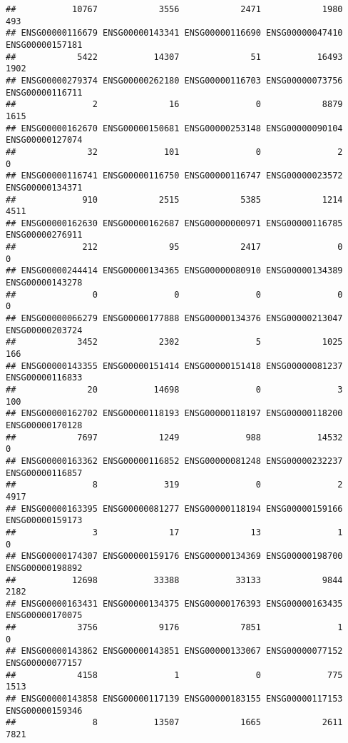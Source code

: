 \documentclass[
]{article}
\begin{document}
\begin{verbatim}
##           10767            3556            2471            1980             493 
## ENSG00000116679 ENSG00000143341 ENSG00000116690 ENSG00000047410 ENSG00000157181 
##            5422           14307              51           16493            1902 
## ENSG00000279374 ENSG00000262180 ENSG00000116703 ENSG00000073756 ENSG00000116711 
##               2              16               0            8879            1615 
## ENSG00000162670 ENSG00000150681 ENSG00000253148 ENSG00000090104 ENSG00000127074 
##              32             101               0               2               0 
## ENSG00000116741 ENSG00000116750 ENSG00000116747 ENSG00000023572 ENSG00000134371 
##             910            2515            5385            1214            4511 
## ENSG00000162630 ENSG00000162687 ENSG00000000971 ENSG00000116785 ENSG00000276911 
##             212              95            2417               0               0 
## ENSG00000244414 ENSG00000134365 ENSG00000080910 ENSG00000134389 ENSG00000143278 
##               0               0               0               0               0 
## ENSG00000066279 ENSG00000177888 ENSG00000134376 ENSG00000213047 ENSG00000203724 
##            3452            2302               5            1025             166 
## ENSG00000143355 ENSG00000151414 ENSG00000151418 ENSG00000081237 ENSG00000116833 
##              20           14698               0               3             100 
## ENSG00000162702 ENSG00000118193 ENSG00000118197 ENSG00000118200 ENSG00000170128 
##            7697            1249             988           14532               0 
## ENSG00000163362 ENSG00000116852 ENSG00000081248 ENSG00000232237 ENSG00000116857 
##               8             319               0               2            4917 
## ENSG00000163395 ENSG00000081277 ENSG00000118194 ENSG00000159166 ENSG00000159173 
##               3              17              13               1               0 
## ENSG00000174307 ENSG00000159176 ENSG00000134369 ENSG00000198700 ENSG00000198892 
##           12698           33388           33133            9844            2182 
## ENSG00000163431 ENSG00000134375 ENSG00000176393 ENSG00000163435 ENSG00000170075 
##            3756            9176            7851               1               0 
## ENSG00000143862 ENSG00000143851 ENSG00000133067 ENSG00000077152 ENSG00000077157 
##            4158               1               0             775            1513 
## ENSG00000143858 ENSG00000117139 ENSG00000183155 ENSG00000117153 ENSG00000159346 
##               8           13507            1665            2611            7821 

\end{verbatim}
\end{document}
